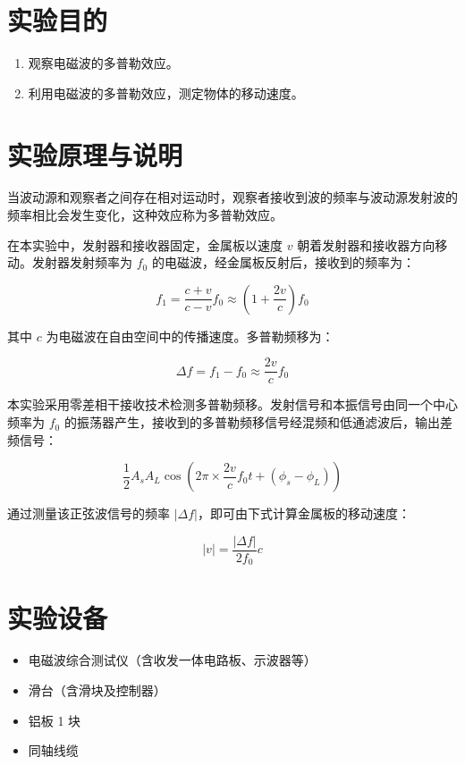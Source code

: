 \documentclass{../ElectromagneticFieldTemplate}
\begin{document}
\maketitle


\section{实验目的}

\begin{enumerate}
    \item 观察电磁波的多普勒效应。
    \item 利用电磁波的多普勒效应，测定物体的移动速度。
\end{enumerate}

\section{实验原理与说明}

当波动源和观察者之间存在相对运动时，观察者接收到波的频率与波动源发射波的频率相比会发生变化，这种效应称为多普勒效应。

在本实验中，发射器和接收器固定，金属板以速度 \(v\) 朝着发射器和接收器方向移动。发射器发射频率为 \(f_0\) 的电磁波，经金属板反射后，接收到的频率为：

\[
f_1 = \frac{c + v}{c - v} f_0 \approx \left(1 + \frac{2v}{c}\right) f_0
\]

其中 \(c\) 为电磁波在自由空间中的传播速度。多普勒频移为：

\[
\Delta f = f_1 - f_0 \approx \frac{2v}{c} f_0
\]

本实验采用零差相干接收技术检测多普勒频移。发射信号和本振信号由同一个中心频率为 \(f_0\) 的振荡器产生，接收到的多普勒频移信号经混频和低通滤波后，输出差频信号：

\[
\frac{1}{2} A_s A_L \cos\left(2\pi \times \frac{2v}{c} f_0 t + (\phi_s - \phi_L)\right)
\]

通过测量该正弦波信号的频率 \(|\Delta f|\)，即可由下式计算金属板的移动速度：

\[
|v| = \frac{|\Delta f|}{2f_0} c
\]

\section{实验设备}

\begin{itemize}
    \item 电磁波综合测试仪（含收发一体电路板、示波器等）
    \item 滑台（含滑块及控制器）
    \item 铝板 1 块
    \item 同轴线缆
\end{itemize}
\end{document}
